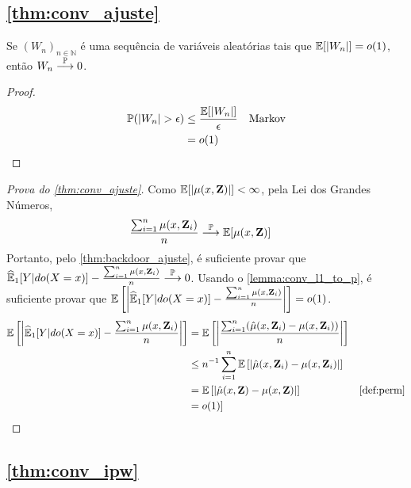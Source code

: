 \subsection{\cref{thm:conv_ajuste}}

\begin{lemma}
 \label{lemma:conv_l1_to_p}
 Se $(W_n)_{n \in \mathbb{N}}$ é uma sequência de
 variáveis aleatórias tais que ${\mathbb E}[|W_n|] = o(1)$,
 então $W_n \stackrel{{\mathbb P}}{\longrightarrow} 0$.
\end{lemma}

\begin{proof}
 \begin{align*}
  {\mathbb P}(|W_n| > \epsilon)
  &\leq \frac{{\mathbb E}[|W_n|]}{\epsilon} & \text{Markov} \\
  &= o(1)
 \end{align*}
\end{proof}

\begin{proof}[Prova do \cref{thm:conv_ajuste}]
 Como ${\mathbb E}[|\mu(x,{\mathbf{Z}})|] < \infty$,
 pela Lei dos Grandes Números,
 \begin{align*}
  \frac{\sum_{i=1}^n \mu(x,{\mathbf{Z}}_i)}{n}
  &\stackrel{{\mathbb P}}{\longrightarrow} {\mathbb E}[\mu(x,{\mathbf{Z}})]
 \end{align*}
 Portanto, pelo \cref{thm:backdoor_ajuste},
 é suficiente provar que
 ${\widehat{{\mathbb E}}}_{1}[Y|do(X=x)] - \frac{\sum_{i=1}^n \mu(x,{\mathbf{Z}}_i)}{n} \stackrel{{\mathbb P}}{\longrightarrow} 0$.
 Usando o \cref{lemma:conv_l1_to_p}, é suficiente provar que 
 ${\mathbb E}\left[\bigg|{\widehat{{\mathbb E}}}_{1}[Y|do(X=x)] - \frac{\sum_{i=1}^n \mu(x,{\mathbf{Z}}_i)}{n}\bigg|\right] 
 = o(1)$.
 \begin{align*}
  \E\left[\bigg|\hdoy - \frac{\sum_{i=1}^n \mu(x,\Z_i)}{n}\bigg|\right]
  &= \E\left[\bigg|\frac{\sum_{i=1}^n 
  (\hat{\mu}(x,\Z_i)-\mu(x,\Z_i))}{n}\bigg|\right] \\
  &\leq n^{-1}\sum_{i=1}^n \E\left[| 
  \hat{\mu}(x,\Z_i)-\mu(x,\Z_i)|\right] \\
  &= \E\left[|\hat{\mu}(x,\Z)-\mu(x,\Z)|\right] 
  & \text{\cref{def:perm}} \\
  &= o(1)]
 \end{align*}
\end{proof}

\subsection{\cref{thm:conv_ipw}}

